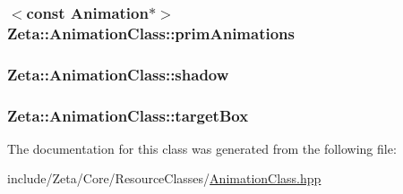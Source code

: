 \hypertarget{classZeta_1_1AnimationClass_a75ec3cd5a2fe104b9e8ac92858faca4c}{
\subsubsection[{prim\+Animations}]{$<$const {\bf Animation}$\ast$$>$ Zeta\+::\+Animation\+Class\+::prim\+Animations\hspace{0.3cm}{\ttfamily [protected]}}}\label{classZeta_1_1AnimationClass_a75ec3cd5a2fe104b9e8ac92858faca4c}
\hypertarget{classZeta_1_1AnimationClass_a5a1c48380989f66dfc1d90caa615ff55}{
\subsubsection[{shadow}]{ Zeta\+::\+Animation\+Class\+::shadow\hspace{0.3cm}{\ttfamily [protected]}}}\label{classZeta_1_1AnimationClass_a5a1c48380989f66dfc1d90caa615ff55}
\hypertarget{classZeta_1_1AnimationClass_a5d9cf5c7819f3f1bc9addadba989e96c}{
\subsubsection[{target\+Box}]{ Zeta\+::\+Animation\+Class\+::target\+Box\hspace{0.3cm}{\ttfamily [protected]}}}\label{classZeta_1_1AnimationClass_a5d9cf5c7819f3f1bc9addadba989e96c}


The documentation for this class was generated from the following file\+:\begin{DoxyCompactItemize}
\item 
include/\+Zeta/\+Core/\+Resource\+Classes/\hyperlink{AnimationClass_8hpp}{Animation\+Class.\+hpp}\end{DoxyCompactItemize}
